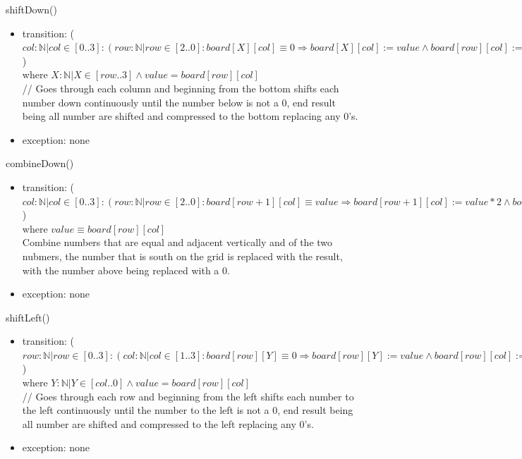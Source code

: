 \documentclass[12pt]{article}
\begin{document}
\noindent shiftDown()
\begin{itemize}
    \item transition: ($col : \mathbb{N} \vert col
    \in [0..3]: (row : \mathbb{N} \vert row \in [2..0]:
    board[X][col] \equiv 0 \Rightarrow board[X][col] := value
    \land board[row][col] := 0)$)\\
    where $X : \mathbb{N} | X \in [row .. 3] \land value = board[row][col]$\\
    // Goes through each column and beginning from the bottom shifts each
    number down continuously until the number below is not a 0, end result
    being all number are shifted and compressed to the bottom replacing any 0's.
    \item exception: none
\end{itemize}

\noindent combineDown()
\begin{itemize}
    \item transition: ($col : \mathbb{N} \vert col
    \in [0..3]: (row : \mathbb{N} \vert row \in [2..0]: board[row+1][col]
    \equiv value \Rightarrow board[row+1][col] := value * 2 \land
    board[row][col] := 0  \land score := score + value * 2)$)\\
    where $value \equiv board[row][col]$\\
    Combine numbers that are equal and adjacent vertically and of the two
    nubmers, the number that is south on the grid is replaced with the
    result, with the number above being replaced with a 0.
    \item exception: none
\end{itemize}

\noindent shiftLeft()
\begin{itemize}
    \item transition: ($row : \mathbb{N} \vert row
    \in [0..3]: (col : \mathbb{N} \vert col \in [1..3]:
    board[row][Y] \equiv 0 \Rightarrow board[row][Y] := value
    \land board[row][col] := 0)$)\\
    where $Y : \mathbb{N} | Y \in [col .. 0] \land value = board[row][col]$\\
    // Goes through each row and beginning from the left shifts each number
    to the left continuously until the number to the left is not a 0, end result
    being all number are shifted and compressed to the left replacing any
    0's.
    \item exception: none
\end{itemize}
\end{document}
